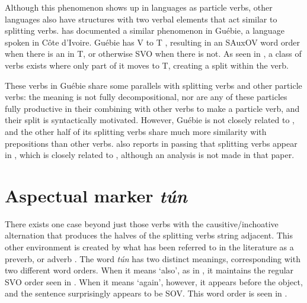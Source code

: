 \documentclass[output=paper]{LSP/langsci}
\begin{document}
Although this phenomenon shows up in  languages as particle verbs, other languages also have structures with two verbal elements that act similar to  splitting verbs. \cite{Sande2016} has documented a similar phenomenon in Gu\'{e}bie, a  language spoken in C\^{o}te d'Ivoire. Gu\'{e}bie has V to T , resulting in an SAuxOV word order when there is an  in T, or otherwise SVO when there is not. As seen in , a class of verbs exists where only part of it moves to T, creating a split within the verb.


\ea 
        
    
        
    \label{ex:parrish:guebie}
 \z 
\z


These verbs in Gu\'{e}bie share some parallels with  splitting verbs and other particle verbs: the meaning is not fully decompositional, nor are any of these particles fully productive in their combining with other verbs to make a particle verb, and their split is syntactically motivated. However, Gu\'{e}bie is not closely related to , and the other half of its splitting verbs share much more similarity with prepositions than other verbs. \citet{Ogie2009} also reports in passing that splitting verbs appear in , which is closely related to , although an analysis is not made in that paper.


\section{Aspectual marker \textit{t\'{u}n}}
\label{sect:parrish:TunSection}

There exists one case beyond just those verbs with the causitive/inchoative alternation that produces the halves of the splitting verbs string adjacent. This other environment is created by what has been referred to in the literature as a preverb, or adverb \citep{Bamgbose1966,Bode2007}. The word \textit{t\'{u}n} has two distinct meanings, corresponding with two different word orders. When it means ‘also’, as in , it maintains the regular SVO order seen in . When it means ‘again’, however, it appears before the object, and the sentence surprisingly appears to be SOV. This word order is seen in .
\end{document}
